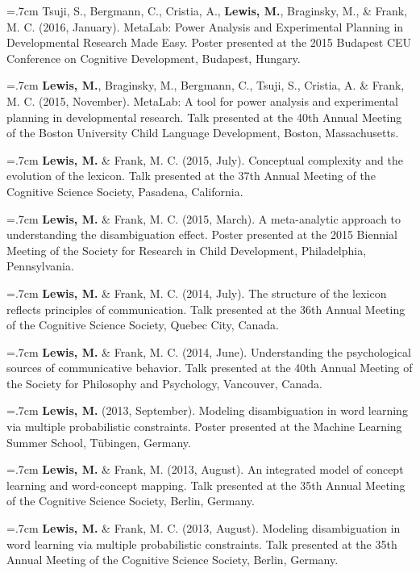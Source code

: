 \documentclass[letterpaper]{article}
\begin{document}
  \hangindent=.7cm  Tsuji, S., Bergmann, C., Cristia, A., {\bf Lewis, M.}, Braginsky, M., \& Frank, M. C. (2016, January). MetaLab: Power Analysis and Experimental Planning in Developmental Research Made Easy. Poster presented at the 2015 Budapest CEU Conference on Cognitive Development, Budapest, Hungary.


\hangindent=.7cm {\bf Lewis, M.},  Braginsky,  M.,  Bergmann, C., Tsuji, S., Cristia, A. \& Frank, M. C. (2015, November). MetaLab: A tool for power analysis and experimental planning in developmental research. Talk presented at the 40th Annual Meeting of the Boston University Child Language Development, Boston, Massachusetts.

\hangindent=.7cm {\bf Lewis, M.} \& Frank, M. C. (2015, July). Conceptual complexity and the evolution of the lexicon. Talk presented at the 37th Annual Meeting of the Cognitive Science Society, Pasadena, California.

\hangindent=.7cm {\bf Lewis, M.} \& Frank, M. C. (2015, March). A meta-analytic approach to understanding the disambiguation effect. Poster presented at  the 2015 Biennial Meeting of the Society for Research in Child Development, Philadelphia, Pennsylvania.


\hangindent=.7cm {\bf Lewis, M.} \& Frank, M. C. (2014, July). The structure of the lexicon reflects  principles of communication. Talk presented at the 36th Annual Meeting of the Cognitive Science Society, Quebec City, Canada.

\hangindent=.7cm {\bf Lewis, M.} \& Frank, M. C. (2014, June). Understanding the psychological sources of communicative behavior. Talk presented at the 40th Annual Meeting of the Society for Philosophy and Psychology, Vancouver, Canada.

 \hangindent=.7cm {\bf Lewis, M.} (2013, September). Modeling disambiguation in word learning via multiple probabilistic constraints. Poster presented at the Machine Learning Summer School, T\"{u}bingen, Germany.


 \hangindent=.7cm {\bf Lewis, M.}  \& Frank, M. (2013, August). An integrated model of concept learning and word-concept mapping. Talk presented at the 35th Annual Meeting of the Cognitive Science Society, Berlin, Germany.

 \hangindent=.7cm {\bf Lewis, M.}  \& Frank, M. C.  (2013, August). Modeling disambiguation in word learning via multiple probabilistic constraints. Talk presented at the 35th Annual Meeting of the Cognitive Science Society, Berlin, Germany.
\end{document}
